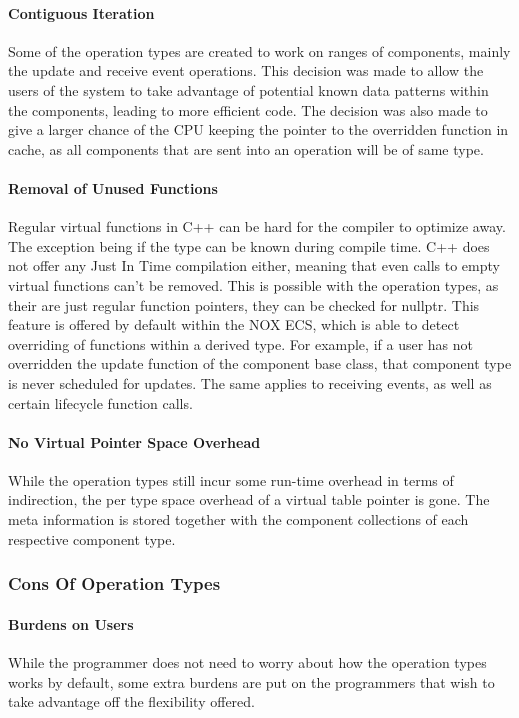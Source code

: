 \paragraph{Contiguous Iteration}
Some of the operation types are created to work on ranges of components, mainly the update and receive event operations.
This decision was made to allow the users of the system to take advantage of potential known data patterns within the components,
leading to more efficient code.
The decision was also made to give a larger chance of the CPU keeping the pointer to the overridden function in cache,
as all components that are sent into an operation will be of same type.

\paragraph{Removal of Unused Functions}
Regular virtual functions in C++ can be hard for the compiler to optimize away. The exception
being if the type can be known during compile time. C++ does not offer any Just In Time compilation either,
meaning that even calls to empty virtual functions can't be removed.
This is possible with the operation types, as their are just regular function pointers, they can be checked for nullptr.
This feature is offered by default within the NOX ECS, which is able to detect overriding of functions within a derived type.
For example, if a user has not overridden the update function of the component base class, that component type is never scheduled
for updates. The same applies to receiving events, as well as certain lifecycle function calls.

\paragraph{No Virtual Pointer Space Overhead}
While the operation types still incur some run-time overhead in terms of indirection,
the per type space overhead of a virtual table pointer is gone.
The meta information is stored together with the component collections of each respective component type.

\subsubsection{Cons Of Operation Types}
\paragraph{Burdens on Users}
While the programmer does not need to worry about how the operation types works by default,
some extra burdens are put on the programmers that wish to take advantage off the flexibility offered.

